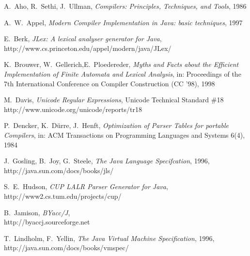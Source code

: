 \documentclass[11pt]{scrartcl}
\newcommand{\trit}{\em}
\begin{document}
\newpage  
\begin{thebibliography}{[00]} 
\label{References} 

  A.~Aho, R.~Sethi, J.~Ullman, {\trit Compilers: Principles, Techniques, and Tools}, 1986


  A.~W.~Appel, {\trit Modern Compiler Implementation in Java: basic techniques}, 1997

 E.~Berk, {\trit JLex: A lexical analyser generator for Java},\\
                   {http://www.cs.princeton.edu/appel/modern/java/JLex/}


  K.~Brouwer, W.~Gellerich,E.~Ploedereder, 
  {\trit Myths and Facts about the Efficient Implementation of Finite Automata and Lexical Analysis}, 
  in: Proceedings of the 7th International Conference on Compiler Construction (CC '98), 1998

  M.~Davis, {\trit Unicode Regular Expressions}, Unicode Technical Standard \#18\\ 
                    {http://www.unicode.org/unicode/reports/tr18}

 P.~Dencker, K.~D{\"u}rre, J.~Henft, {\trit Optimization of Parser Tables for portable Compilers}, 
 in: ACM Transactions on Programming Languages and Systems 6(4), 1984

  J.~Gosling, B.~Joy, G.~Steele, {\trit The Java Language Specifcation}, 1996,\\
                    {http://java.sun.com/docs/books/jls/}

  S.~E.~Hudson, {\trit CUP LALR Parser Generator for Java},\\  
  {http://www2.cs.tum.edu/projects/cup/}

  B.~Jamison, {\trit BYacc/J},\\
  {http://byaccj.sourceforge.net}
  
 T.~Lindholm, F.~Yellin, {\trit The Java Virtual Machine Specification}, 1996,\\
                   {http://java.sun.com/docs/books/vmspec/}
 

\end{thebibliography}
\end{document}
